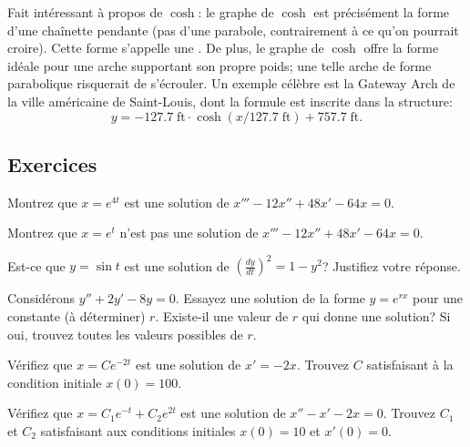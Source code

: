 Fait intéressant à propos de $\cosh$:  le graphe de $\cosh$ est précisément la forme d'une
chaînette pendante (pas d'une parabole, contrairement à ce qu'on pourrait croire).
Cette forme s'appelle une \emph{}.
De plus, le graphe de $\cosh$ offre la forme idéale pour une arche supportant son propre poids;
une telle arche de forme parabolique risquerait de s'écrouler.
Un exemple célèbre est la  {Gateway Arch} de la ville
américaine de Saint-Louis, dont la formule est inscrite dans la structure:
\begin{equation*}
	y = -127.7 \; \textrm{ft} \cdot \cosh\left( x /127.7  \; \textrm{ft} \right) + 757.7 \;\textrm{ft} .
\end{equation*}


\subsection{Exercices}

\begin{exercise}
	Montrez que $x = e^{4t}$ est une solution de $x'''-12 x'' + 48 x' - 64 x = 0$.
\end{exercise}

\begin{exercise}
	Montrez que $x = e^{t}$ n'est pas une solution de $x'''-12 x'' + 48 x' - 64 x = 0$.
\end{exercise}

\begin{exercise}
	Est-ce que $y = \sin t$ est une solution de ${\left( \frac{dy}{dt} \right)}^2 = 1 - y^2$?
	Justifiez votre réponse.
\end{exercise}

\begin{exercise}
	Considérons $y'' + 2y' - 8y = 0$.
	Essayez une solution de la forme $y = e^{rx}$ pour une constante (à déterminer) $r$.
	Existe-il une valeur de $r$ qui donne une solution? Si oui, trouvez toutes les valeurs possibles de $r$.
\end{exercise}

\begin{exercise}
	Vérifiez que $x = C e^{-2t}$ est une solution de $x' = -2x$.
	Trouvez $C$ satisfaisant à la condition initiale $x(0) = 100$.
\end{exercise}

\begin{exercise}
	Vérifiez que $x = C_1 e^{-t} + C_2 e^{2t}$ est une solution de $x'' - x' -2 x =	0$.
	Trouvez $C_1$ et $C_2$ satisfaisant aux conditions initiales $x(0) = 10$
	et $x'(0) = 0$.
\end{exercise}

